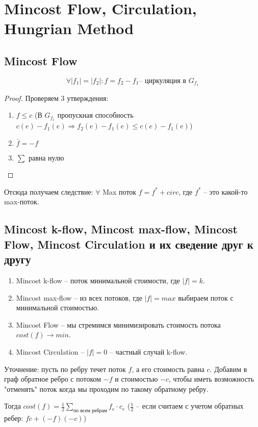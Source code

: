 ﻿\section{Mincost Flow, Circulation, Hungrian Method}

\subsection{Mincost Flow}
\begin{lemma}
	\[ 
		\forall |f_1|=|f_2|\colon f = f_2 - f_1 \text{-- циркуляция в } G_{f_1}
	\]
\end{lemma}
\begin{proof}
	Проверяем 3 утверждения:
	\begin{enumerate}
		\item $f \le c$  (В $G_{f_1}$ пропускная способность $c(e) - f_1(e) \Rightarrow f_2(e) - f_1(e) \le c(e) - f_1(e)$)
		\item $\overline{f} = -f$
		\item $\sum$ равна нулю
	\end{enumerate}
\end{proof}

Отсюда получаем следствие: $\forall$ Max поток $f = f^* + circ$, где $f^*$ -- это какой-то max-поток.


\subsection{Mincost k-flow, Mincost max-flow, Mincost Flow, Mincost Circulation и их сведение друг к другу}
	\begin{enumerate}
		\item Mincost k-flow -- поток минимальной стоимости, где $|f| = k$.
		\item Mincost max-flow -- из всех потоков, где $|f| = max$ выбираем поток с минимальной стоимостью.
		\item Mincost Flow -- мы стремимся минимизировать стоимость потока $cost(f) \to min$.
		\item Mincost Circulation -- $|f| = 0$ -- частный случай k-flow. 
	\end{enumerate}	

Уточнение: пусть по ребру течет поток $f$, а его стоимость равна $c$. Добавим в граф обратное ребро с потоком $-f$ и стоимостью $-c$, чтобы иметь возможность "отменять" поток когда мы проходим по такому обратному ребру.

Тогда $cost(f) = \frac{1}{2}\sum_{\text {по всем ребрам}} f_e\cdot c_e$ ($\frac{1}{2}$ -- если считаем с учетом обратных ребер: $fc + (-f)(-c)$)

